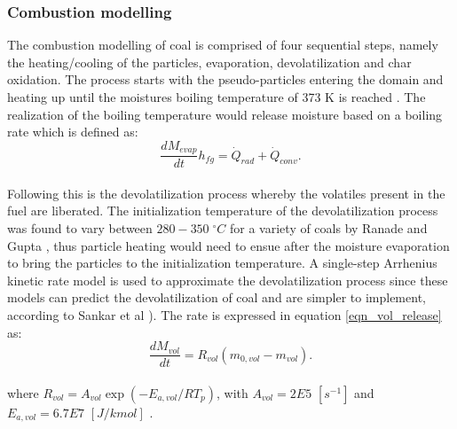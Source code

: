 \documentclass{webofc}
\begin{document}
\subsubsection{Combustion modelling}
The combustion modelling of coal is comprised of four sequential steps, namely the heating/cooling of the particles, evaporation, devolatilization and char oxidation. The process starts with the pseudo-particles entering the domain and heating up until the moistures boiling temperature of 373 K is reached \cite{cengel}. The realization of the boiling temperature would release moisture based on a boiling rate which is defined as:
\\
\begin{equation}\label{eqn_evap_release}
\frac{dM_{evap}}{dt}h_{fg}=\dot{Q}_{rad} + \dot{Q}_{conv}.
\end{equation}
\\
Following this is the devolatilization process whereby the volatiles present in the fuel are liberated. The initialization temperature of the devolatilization process was found to vary between $280 - 350\;^{\circ}C$ for a variety of coals by Ranade and Gupta \cite{gupta}, thus particle heating would need to ensue after the moisture evaporation to bring the particles to the initialization temperature. A single-step Arrhenius kinetic rate model is used to approximate the devolatilization process since these models can predict the devolatilization of coal and are simpler to implement, according to Sankar et al \cite{sankar}). The rate is expressed in equation \ref{eqn_vol_release} as:\\
\begin{equation}\label{eqn_vol_release}
\frac{dM_{vol}}{dt}=R_{vol}(m_{0,vol}-m_{vol}).
\end{equation}\\
where $R_{vol} = A_{vol} \exp(-E_{a,vol} / R T_p)$, with $A_{vol} = 2E5$ $[s^{-1}]$ and $E_{a,vol} = 6.7E7$ $[J/kmol]$ . %
\end{document}
